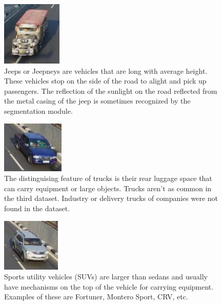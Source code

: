 \documentclass[conference]{IEEEtran}
\begin{document}
\begin{figure}[!h]
\centering
\includegraphics{vehicle_jeep.png}
\caption{Jeeps or Jeepneys are vehicles that are long with average height. These vehicles stop on the side of the road to alight and pick up passengers. The reflection of the sunlight on the road reflected from the metal casing of the jeep is sometimes recognized by the segmentation module.}
\label{fig_jeep}
\end{figure}

\begin{figure}[!h]
\centering
\includegraphics{vehicle_truck.png}
\caption{The distinguising feature of trucks is their rear luggage space that can carry equipment or large objects. Trucks aren't as common in the third dataset. Industry or delivery trucks of companies were not found in the dataset.}
\label{fig_truck}
\end{figure}

\begin{figure}[!h]
\centering
\includegraphics{vehicle_suv.png}
\caption{Sports utility vehicles (SUVs) are larger than sedans and usually have mechanisms on the top of the vehicle for carrying equipment. Examples of these are Fortuner, Montero Sport, CRV, etc.}
\label{fig_suv}
\end{figure}
\end{document}
